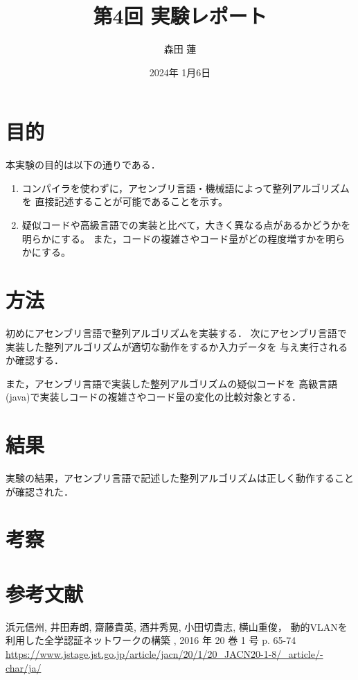 \documentclass{jlreq}
\title{第4回 実験レポート}
\author{森田 蓮}
\date{2024年 1月6日}
\begin{document}
\maketitle

\section{目的}
本実験の目的は以下の通りである．
\begin{enumerate}
    \item コンパイラを使わずに，アセンブリ言語・機械語によって整列アルゴリズムを
    直接記述することが可能であることを示す。
    \item 疑似コードや高級言語での実装と比べて，大きく異なる点があるかどうかを明らかにする。
    また，コードの複雑さやコード量がどの程度増すかを明らかにする。
\end{enumerate}


\section{方法}
初めにアセンブリ言語で整列アルゴリズムを実装する．
次にアセンブリ言語で実装した整列アルゴリズムが適切な動作をするか入力データを
与え実行されるか確認する．

また，アセンブリ言語で実装した整列アルゴリズムの疑似コードを
高級言語(java)で実装しコードの複雑さやコード量の変化の比較対象とする．


\section{結果}
実験の結果，アセンブリ言語で記述した整列アルゴリズムは正しく動作することが確認された．


\section{考察}



\section*{参考文献}
浜元信州, 井田寿朗, 齋藤貴英, 酒井秀晃, 小田切貴志, 横山重俊，
動的VLANを利用した全学認証ネットワークの構築  
, 2016 年 20 巻 1 号 p. 65-74  
\url{https://www.jstage.jst.go.jp/article/jacn/20/1/20_JACN20-1-8/_article/-char/ja/}
\end{document}
